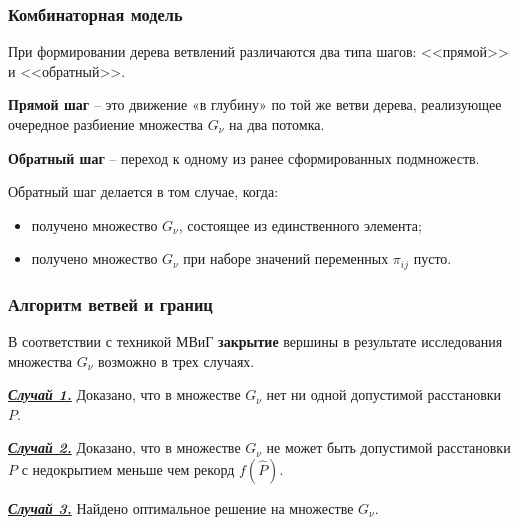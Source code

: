 \begin{frame}
    \frametitle{Комбинаторная модель}
    \justifying
    \begin{minipage}[t]{1\linewidth}
        \fontsize{9pt}{7.2}\selectfont

        При формировании дерева ветвлений различаются два типа шагов: <<прямой>> и <<обратный>>. 
    \end{minipage}
    
    \begin{minipage}[b]{0.5\linewidth}
        \fontsize{9pt}{7.2}\selectfont
        \textbf{Прямой шаг} -- это движение «в глубину» по той же ветви дерева, реализующее очередное разбиение множества $G_\nu$ на два потомка.
        \bigskip

        \textbf{Обратный шаг} -- переход к одному из ранее сформированных подмножеств. 
        \bigskip

        Обратный шаг делается в том случае, когда: 
        \begin{itemize}
            \item  получено множество $G_\nu$, состоящее из единственного элемента;
            \item  получено множество $G_\nu$  при наборе значений переменных $\pi_{ij}$ пусто. 
        \end{itemize}
    \end{minipage}
    \hfill
    \begin{minipage}[b]{0.47\linewidth}
        
    \end{minipage}
    \hfill


\end{frame}

\begin{frame}
    \frametitle{Алгоритм ветвей и границ}
    \justifying
    В соответствии с техникой МВиГ \textbf{закрытие} вершины в результате исследования множества $G_\nu$ возможно в трех случаях.
    \bigskip

    \underline{\textit{\textbf{Случай 1.}}} Доказано, что в множестве $G_\nu$ нет ни одной допустимой расстановки $P$.
    \bigskip

    \underline{\textit{\textbf{Случай 2.}}} Доказано, что в множестве $G_\nu$ не может быть допустимой расстановки $P$ с недокрытием меньше чем рекорд $f(\widehat{P})$.
    
    \bigskip 
    
    \underline{\textit{\textbf{Случай 3.}}} Найдено оптимальное решение на множестве $G_\nu$.

\end{frame}

